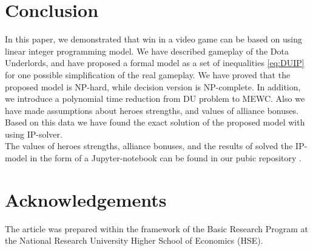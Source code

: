\documentclass[smallextended]{svjour3}       %
\begin{document}
\section{Conclusion}
\label{SectionConclusion}
In this paper, we demonstrated that win in a video game can be based on using linear integer programming model.
We have described gameplay of the Dota Underlords, and have proposed a formal model as a set of inequalities \eqref{eq:DUIP} for one possible simplification of the real gameplay. We have proved that the proposed model is NP-hard, while decision version is NP-complete. In addition, we introduce a polynomial time reduction from DU problem to MEWC. Also we have made assumptions about heroes strengths, and values of alliance bonuses. Based on this data we have found the exact solution of the proposed model with using IP-solver. \\
The values of heroes  strengths, alliance bonuses, and  the results of solved the IP-model in the form of a Jupyter-notebook can be found in our pubic repository \cite{UnderLordsInput}.
\section{Acknowledgements}
The article was prepared within the framework of the Basic Research Program at the National Research University Higher School of Economics (HSE).



\end{document}
